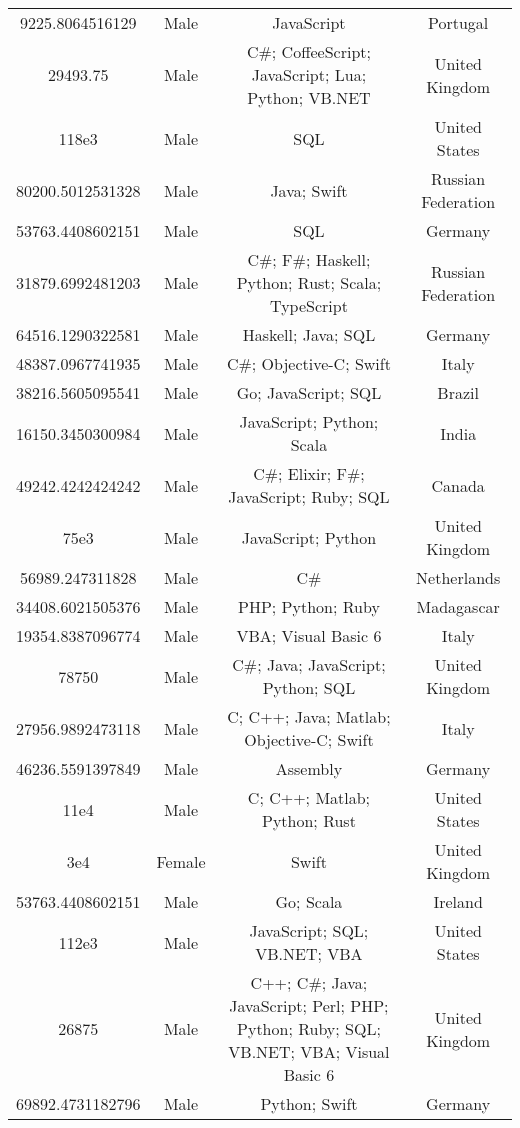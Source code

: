 \begin{center}
\begin{tabular}{ |c|c|c|c| }
9225.8064516129  &  Male  &  JavaScript  &  Portugal  \\ 
29493.75  &  Male  &  C\#; CoffeeScript; JavaScript; Lua; Python; VB.NET  &  United Kingdom  \\ 
118e3  &  Male  &  SQL  &  United States  \\ 
80200.5012531328  &  Male  &  Java; Swift  &  Russian Federation  \\ 
53763.4408602151  &  Male  &  SQL  &  Germany  \\ 
31879.6992481203  &  Male  &  C\#; F\#; Haskell; Python; Rust; Scala; TypeScript  &  Russian Federation  \\ 
64516.1290322581  &  Male  &  Haskell; Java; SQL  &  Germany  \\ 
48387.0967741935  &  Male  &  C\#; Objective-C; Swift  &  Italy  \\ 
38216.5605095541  &  Male  &  Go; JavaScript; SQL  &  Brazil  \\ 
16150.3450300984  &  Male  &  JavaScript; Python; Scala  &  India  \\ 
49242.4242424242  &  Male  &  C\#; Elixir; F\#; JavaScript; Ruby; SQL  &  Canada  \\ 
75e3  &  Male  &  JavaScript; Python  &  United Kingdom  \\ 
56989.247311828  &  Male  &  C\#  &  Netherlands  \\ 
34408.6021505376  &  Male  &  PHP; Python; Ruby  &  Madagascar  \\ 
19354.8387096774  &  Male  &  VBA; Visual Basic 6  &  Italy  \\ 
78750  &  Male  &  C\#; Java; JavaScript; Python; SQL  &  United Kingdom  \\ 
27956.9892473118  &  Male  &  C; C++; Java; Matlab; Objective-C; Swift  &  Italy  \\ 
46236.5591397849  &  Male  &  Assembly  &  Germany  \\ 
11e4  &  Male  &  C; C++; Matlab; Python; Rust  &  United States  \\ 
3e4  &  Female  &  Swift  &  United Kingdom  \\ 
53763.4408602151  &  Male  &  Go; Scala  &  Ireland  \\ 
112e3  &  Male  &  JavaScript; SQL; VB.NET; VBA  &  United States  \\ 
26875  &  Male  &  C++; C\#; Java; JavaScript; Perl; PHP; Python; Ruby; SQL; VB.NET; VBA; Visual Basic 6  &  United Kingdom  \\ 
69892.4731182796  &  Male  &  Python; Swift  &  Germany  \\ 

\end{tabular}
\end{center}
